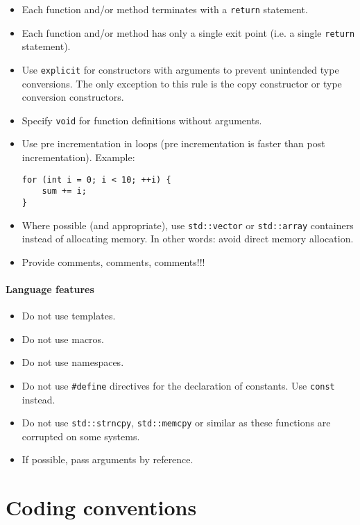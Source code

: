 \documentclass{article}[12pt,a4]
\begin{document}
\begin{itemize}
\item Each function and/or method terminates with a {\tt return} statement.
\item Each function and/or method has only a single exit point (i.e. a single {\tt return} statement).
\item Use {\tt explicit} for constructors with arguments to prevent unintended type conversions.
The only exception to this rule is the copy constructor or type conversion constructors.
\item Specify {\tt void} for function definitions without arguments.
\item Use pre incrementation in loops (pre incrementation is faster than post incrementation).
Example:
\begin{verbatim}
for (int i = 0; i < 10; ++i) {
    sum += i;
}
\end{verbatim}
\item Where possible (and appropriate), use {\tt std::vector} or {\tt std::array} containers instead of
allocating memory. In other words: avoid direct memory allocation.
\item Provide comments, comments, comments!!!
\end{itemize}


\paragraph{Language features}

\begin{itemize}
\item Do not use templates.
\item Do not use macros.
\item Do not use namespaces.
\item Do not use {\tt \#define} directives for the declaration of constants. Use {\tt const} instead.
\item Do not use {\tt std::strncpy}, {\tt std::memcpy} or similar as these functions are corrupted on
some systems.
\item If possible, pass arguments by reference.
\end{itemize}


\section{Coding conventions}
\end{document}
